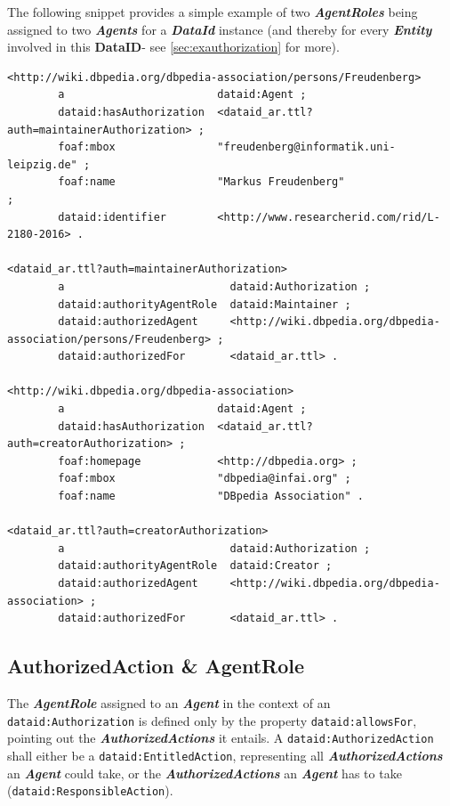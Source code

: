 \documentclass[a4paper,english,twoside,BCOR1.5cm,headsepline,DIV12,appendixprefix,final,12pt]{scrbook}
\newcommand{\dataid}{{\ttfamily\bfseries DataID}\xspace}
\newcommand{\prop}[1]{{{\texttt{#1}}}}
\newcommand{\important}[1]{\textbf{\textit{#1}}}
\begin{document}
The following snippet provides a simple example of two \important{AgentRoles} being assigned to two \important{Agents} for a \important{DataId} instance (and thereby for every \important{Entity} involved in this \dataid  - see \cref{sec:exauthorization} for more).
\\
\begin{lstlisting}[language=ttl, captionpos=b,caption=Example of an organisation,label=lst:coresuperset,linewidth=\columnwidth,breaklines=true]
<http://wiki.dbpedia.org/dbpedia-association/persons/Freudenberg>
        a                        dataid:Agent ;                                               
        dataid:hasAuthorization  <dataid_ar.ttl?auth=maintainerAuthorization> ;
        foaf:mbox                "freudenberg@informatik.uni-leipzig.de" ;
        foaf:name                "Markus Freudenberg"                     ;
        dataid:identifier        <http://www.researcherid.com/rid/L-2180-2016> .              

<dataid_ar.ttl?auth=maintainerAuthorization>
        a                          dataid:Authorization ;                                     
        dataid:authorityAgentRole  dataid:Maintainer ;                                        
        dataid:authorizedAgent     <http://wiki.dbpedia.org/dbpedia-association/persons/Freudenberg> ;
        dataid:authorizedFor       <dataid_ar.ttl> .                                          

<http://wiki.dbpedia.org/dbpedia-association>
        a                        dataid:Agent ;                                               
        dataid:hasAuthorization  <dataid_ar.ttl?auth=creatorAuthorization> ;
        foaf:homepage            <http://dbpedia.org> ;
        foaf:mbox                "dbpedia@infai.org" ;
        foaf:name                "DBpedia Association" .

<dataid_ar.ttl?auth=creatorAuthorization>
        a                          dataid:Authorization ;
        dataid:authorityAgentRole  dataid:Creator ;                                           
        dataid:authorizedAgent     <http://wiki.dbpedia.org/dbpedia-association> ;
        dataid:authorizedFor       <dataid_ar.ttl> .
\end{lstlisting}

\subsection{AuthorizedAction \& AgentRole} 
\label{sec:coreaction}
The \important{AgentRole} assigned to an \important{Agent} in the context of an \prop{dataid:Authorization} is defined only by the property \prop{dataid:allowsFor}, pointing out the \important{AuthorizedActions} it entails. A \prop{dataid:AuthorizedAction} shall either be a \prop{dataid:EntitledAction}, representing all \important{AuthorizedActions} an \important{Agent} could take, or the \important{AuthorizedActions} an \important{Agent} has to take (\prop{dataid:ResponsibleAction}). 
\end{document}
